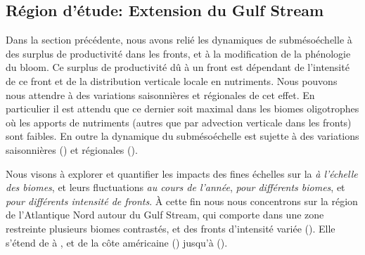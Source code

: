 \begin{figure}
  \centering
  \label{fig:early-bloom-mahadevan}
\end{figure}

\subsection{Région d'étude: Extension du Gulf Stream}
\label{sec:region-detude}

Dans la section précédente, nous avons relié les dynamiques de submésoéchelle à des surplus de productivité dans les fronts, et à la modification de la phénologie du bloom.
Ce surplus de productivité dû à un front est dépendant de l'intensité de ce front et de la distribution verticale locale en nutriments.
Nous pouvons nous attendre à des variations saisonnières et régionales de cet effet.
En particulier il est attendu que ce dernier soit maximal dans les biomes oligotrophes où les apports de nutriments (autres que par advection verticale dans les fronts) sont faibles.
En outre la dynamique du submésoéchelle est sujette à des variations saisonnières (\cite{callies_2015}) et régionales (\cite{mauzole_2022}).

Nous visons à explorer et quantifier les impacts des fines échelles sur la  \emph{à l'échelle des biomes}, et leurs fluctuations \emph{au cours de l'année}, \emph{pour différents biomes}, et \emph{pour différents intensité de fronts}.
À cette fin nous nous concentrons sur la région de l'Atlantique Nord autour du Gulf Stream, qui comporte dans une zone restreinte plusieurs biomes contrastés, et des fronts d'intensité variée (\cite{bock_2022}).
Elle s'étend de  à , et de la côte américaine () jusqu'à  ().

\begin{figure}
  \centering
  \label{fig:region}
\end{figure}

